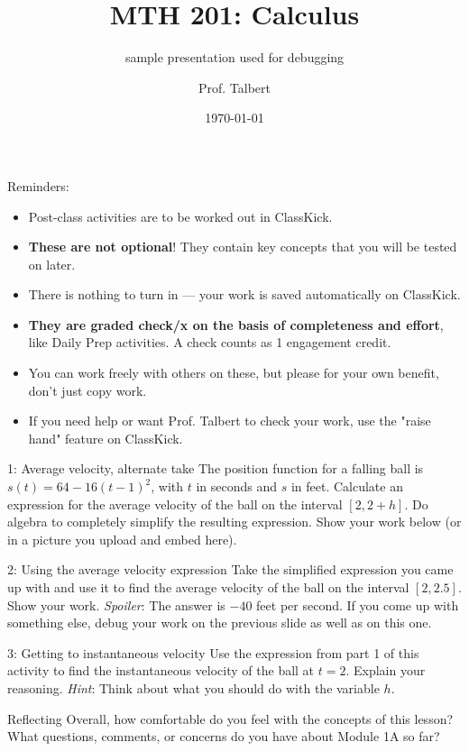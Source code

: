 \documentclass{beamer}
\title{MTH 201: Calculus}
\subtitle{sample presentation used for debugging}
\author{Prof. Talbert}
\institute{GVSU}
\date{\today}
\begin{document}
\frame{\titlepage}

\begin{frame}{Reminders:}

\begin{itemize}
    \item Post-class activities are to be worked out in ClassKick.
    \item \textbf{These are not optional}! They contain key concepts that you will be tested on later. 
    \item There is nothing to turn in --- your work is saved automatically on ClassKick. 
    \item \textbf{They are graded check/x on the basis of completeness and effort}, like Daily Prep activities. A check counts as 1 engagement credit. 
    \item You can work freely with others on these, but please for your own benefit, don't just copy work. 
    \item If you need help or want Prof. Talbert to check your work, use the "raise hand" feature on ClassKick. 
\end{itemize}

\end{frame}


\begin{frame}[t]{1: Average velocity, alternate take}
The position function for a falling ball is $s(t)=64-16(t-1)^2$, with $t$ in seconds and $s$ in feet. Calculate an expression for the average velocity of the ball on the interval $[2,2+h]$. Do algebra to completely simplify the resulting expression. Show your work below (or in a picture you upload and embed here). 
    
\end{frame}

\begin{frame}[t]{2: Using the average velocity expression}
Take the simplified expression you came up with and use it to find the average velocity of the ball on the interval $[2, 2.5]$. Show your work. \textit{Spoiler}: The answer is $-40$ feet per second. If you come up with something else, debug your work on the previous slide as well as on this one. 

\end{frame}

\begin{frame}[t]{3: Getting to instantaneous velocity}
    Use the expression from part 1 of this activity to find the instantaneous velocity of the ball at $t=2$. Explain your reasoning. \textit{Hint}: Think about what you should do with the variable $h$. 
\end{frame}

\begin{frame}[t]{Reflecting}
Overall, how comfortable do you feel with the concepts of this lesson? What questions, comments, or concerns do you have about Module 1A so far?     
    
    
\end{frame}
\end{document}
